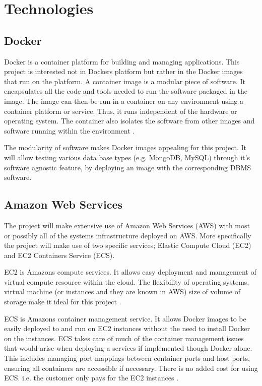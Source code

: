 \section{Technologies}

\subsection{Docker}
Docker is a container platform for building and managing applications. This project is interested not in Dockers platform but rather in the Docker images that run on the platform. A container image is a modular piece of software. It encapsulates all the code and tools needed to run the software packaged in the image. The image can then be run in a container on any environment using a container platform or service. Thus, it runs independent of the hardware or operating system. The container also isolates the software from other images and software running within the environment \citep{docker}.

The modularity of software makes Docker images appealing for this project. It will allow testing various data base types (e.g. MongoDB, MySQL) through it's software agnostic feature, by deploying an image with the corresponding DBMS software.

\subsection{Amazon Web Services}
The project will make extensive use of Amazon Web Services (AWS) with most or possibly all of the systems infrastructure deployed on AWS. More specifically the project will make use of two specific services; Elastic Compute Cloud (EC2) and EC2 Containers Service (ECS).

EC2 is Amazons compute services. It allows easy deployment and management of virtual compute resource within the cloud. The flexibility of operating systems, virtual machine (or instances and they are known in AWS) size of volume of storage make it ideal for this project \citep{ec2}.

ECS is Amazons container management service. It allows Docker images to be easily deployed to and run on  EC2 instances without the need to install Docker on the instances. ECS takes care of much of the container management issues that would arise when deploying a services if implemented though Docker alone. This includes managing port mappings between container ports and host ports, ensuring all containers are accessible if necessary. There is no added cost for using ECS. i.e. the customer only pays for the EC2 instances \citep{ecs}. 


